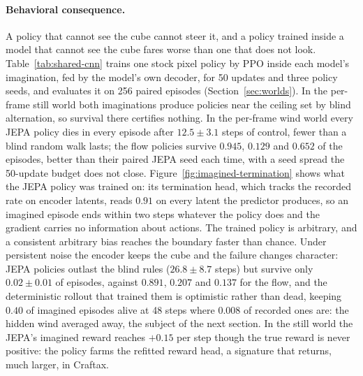 \paragraph{Behavioral consequence.}
A policy that cannot see the cube cannot steer it, and a policy trained inside a model that cannot
see the cube fares worse than one that does not look. Table~\ref{tab:shared-cnn} trains one stock
pixel policy by PPO inside each model's imagination, fed by the model's own decoder, for 50 updates
and three policy seeds, and evaluates it on 256 paired episodes (Section~\ref{sec:worlds}). In the
per-frame still world both imaginations produce policies near the ceiling set by blind alternation,
so survival there certifies nothing. In the per-frame wind world every JEPA policy dies in every
episode after $12.5\pm3.1$ steps of control, fewer than a blind random walk lasts; the flow
policies survive $0.945$, $0.129$ and $0.652$ of the episodes, better than their paired JEPA seed
each time, with a seed spread the 50-update budget does not close.
Figure~\ref{fig:imagined-termination} shows what the JEPA policy was trained on: its termination
head, which tracks the recorded rate on encoder latents, reads $0.91$ on every latent the
predictor produces, so an imagined episode ends within two steps whatever the policy does and the
gradient carries no information about actions. The trained policy is arbitrary, and a consistent
arbitrary bias reaches the boundary faster than chance. Under persistent noise the encoder keeps
the cube and the failure changes character: JEPA policies outlast the blind rules ($26.8\pm8.7$
steps) but survive only $0.02\pm0.01$ of episodes, against $0.891$, $0.207$ and $0.137$ for the
flow, and the deterministic rollout that trained them is optimistic rather than dead, keeping $0.40$
of imagined episodes alive at 48 steps where $0.008$ of recorded ones are: the hidden wind averaged
away, the subject of the next section. In the still world the JEPA's imagined reward reaches
$+0.15$ per step though the true reward is never positive: the policy farms the refitted reward
head, a signature that returns, much larger, in Craftax.
